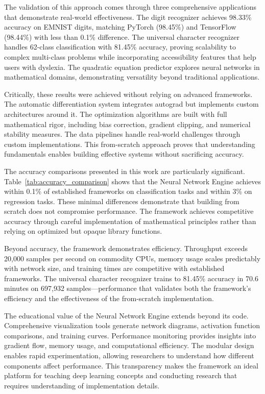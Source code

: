 \documentclass[11pt,a4paper]{report}
\begin{document}
The validation of this approach comes through three comprehensive applications that demonstrate real-world effectiveness. The digit recognizer achieves 98.33\% accuracy on EMNIST digits, matching PyTorch (98.45\%) and TensorFlow (98.44\%) with less than 0.1\% difference. The universal character recognizer handles 62-class classification with 81.45\% accuracy, proving scalability to complex multi-class problems while incorporating accessibility features that help users with dyslexia. The quadratic equation predictor explores neural networks in mathematical domains, demonstrating versatility beyond traditional applications.

Critically, these results were achieved without relying on advanced frameworks. The automatic differentiation system integrates autograd but implements custom architectures around it. The optimization algorithms are built with full mathematical rigor, including bias correction, gradient clipping, and numerical stability measures. The data pipelines handle real-world challenges through custom implementations. This from-scratch approach proves that understanding fundamentals enables building effective systems without sacrificing accuracy.

The accuracy comparisons presented in this work are particularly significant. Table~\ref{tab:accuracy_comparison} shows that the Neural Network Engine achieves within 0.1\% of established frameworks on classification tasks and within 3\% on regression tasks. These minimal differences demonstrate that building from scratch does not compromise performance. The framework achieves competitive accuracy through careful implementation of mathematical principles rather than relying on optimized but opaque library functions.

Beyond accuracy, the framework demonstrates efficiency. Throughput exceeds 20,000 samples per second on commodity CPUs, memory usage scales predictably with network size, and training times are competitive with established frameworks. The universal character recognizer trains to 81.45\% accuracy in 70.6 minutes on 697,932 samples—performance that validates both the framework's efficiency and the effectiveness of the from-scratch implementation.

The educational value of the Neural Network Engine extends beyond its code. Comprehensive visualization tools generate network diagrams, activation function comparisons, and training curves. Performance monitoring provides insights into gradient flow, memory usage, and computational efficiency. The modular design enables rapid experimentation, allowing researchers to understand how different components affect performance. This transparency makes the framework an ideal platform for teaching deep learning concepts and conducting research that requires understanding of implementation details.
\end{document}
